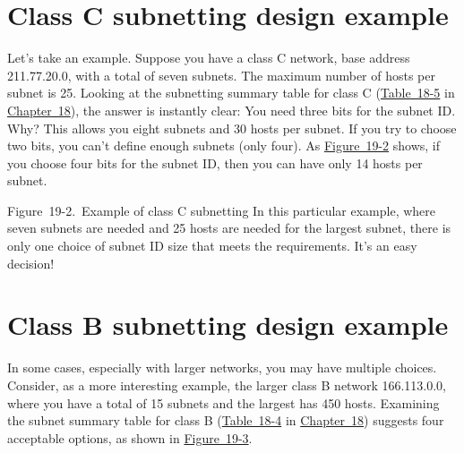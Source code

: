 \section{Class C subnetting design example}

\protect\hypertarget{ch19s02.htmlux5cux23idx-CHP-19-0748}{}{}Let's take
an example. Suppose you have a class C network, base address
211.77.20.0, with a total of seven subnets. The maximum number of hosts
per subnet is 25. Looking at the subnetting summary table for class C
(\protect\hyperlink{ch18s07.htmlux5cux23subnetting_summary_table_for_class_c_net}{Table~18-5}
in \protect\hyperlink{ch18.html}{Chapter~18}), the answer is instantly
clear: You need three bits for the subnet ID. Why? This allows you eight
subnets and 30 hosts per subnet. If you try to choose two bits, you
can't define enough subnets (only four). As
\protect\hyperlink{ch19s02.htmlux5cux23example_of_class_c_subnetting_in_this_pa}{Figure~19-2}
shows, if you choose four bits for the subnet ID, then you can have only
14 hosts per subnet.

\protect\hypertarget{ch19s02.htmlux5cux23example_of_class_c_subnetting_in_this_pa}{}{}

\protect\hypertarget{ch19s02.htmlux5cux23I_mediaobject5_d1e20669}{}{}

Figure~19-2.~Example of class C subnetting In this particular example,
where seven subnets are needed and 25 hosts are needed for the largest
subnet, there is only one choice of subnet ID size that meets the
requirements. It's an easy decision!

\section{Class B subnetting design example}

In some cases, especially with larger networks, you may have multiple
choices. Consider, as a more interesting
\protect\hypertarget{ch19s02.htmlux5cux23idx-CHP-19-0749}{}{}example,
the larger class B network 166.113.0.0, where you have a total of 15
subnets and the largest has 450 hosts. Examining the subnet summary
table for class B
(\protect\hyperlink{ch18s07.htmlux5cux23subnetting_summary_table_for_class_b_net}{Table~18-4}
in \protect\hyperlink{ch18.html}{Chapter~18}) suggests four acceptable
options, as shown in
\protect\hyperlink{ch19s02.htmlux5cux23example_of_class_b_subnetting_this_class}{Figure~19-3}.

